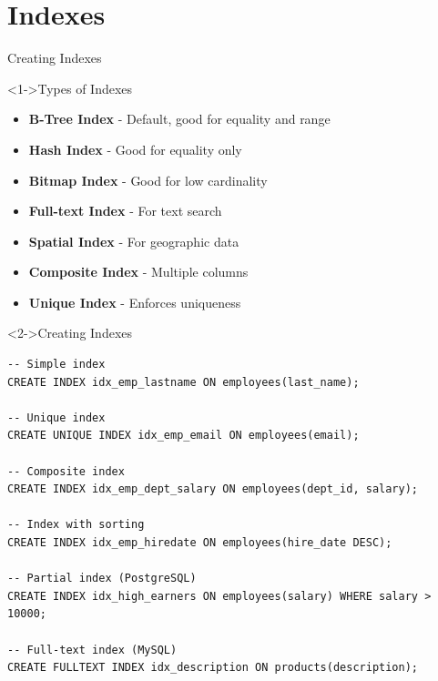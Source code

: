\documentclass[aspectratio=169,11pt]{beamer}
\begin{document}
\section{Indexes}

\begin{frame}[fragile]{Creating Indexes}
\begin{block}<1->{Types of Indexes}
\begin{itemize}
    \item \textbf{B-Tree Index} - Default, good for equality and range
    \item \textbf{Hash Index} - Good for equality only
    \item \textbf{Bitmap Index} - Good for low cardinality
    \item \textbf{Full-text Index} - For text search
    \item \textbf{Spatial Index} - For geographic data
    \item \textbf{Composite Index} - Multiple columns
    \item \textbf{Unique Index} - Enforces uniqueness
\end{itemize}
\end{block}

\pause
\begin{exampleblock}<2->{Creating Indexes}
\begin{lstlisting}
-- Simple index
CREATE INDEX idx_emp_lastname ON employees(last_name);

-- Unique index
CREATE UNIQUE INDEX idx_emp_email ON employees(email);

-- Composite index
CREATE INDEX idx_emp_dept_salary ON employees(dept_id, salary);

-- Index with sorting
CREATE INDEX idx_emp_hiredate ON employees(hire_date DESC);

-- Partial index (PostgreSQL)
CREATE INDEX idx_high_earners ON employees(salary) WHERE salary > 10000;

-- Full-text index (MySQL)
CREATE FULLTEXT INDEX idx_description ON products(description);
\end{lstlisting}
\end{exampleblock}
\end{frame}
\end{document}
